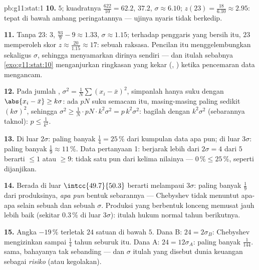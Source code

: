 \begin{solution}{pb:g11:stat:1}
\textbf{10.}  $5$;  kuadratnya $\frac{622}{10} = 62.2$,
 $37.2$, $\sigma \approx 6.10$;
$z(23) = \frac{18}{6.10} \approx 2.95$: tepat di bawah ambang
peringatannya --- ujinya nyaris tidak berkedip.

\textbf{11.} Tanpa $23$:  $3$, 
$\frac{93}{9} - 9 \approx 1.33$, $\sigma \approx 1.15$;
terhadap penggaris yang bersih itu, $23$ memperoleh skor
$z \approx \frac{20}{1.15} \approx 17$: sebuah raksasa. Pencilan itu
menggelembungkan  sekaligus $\sigma$, sehingga menyamarkan dirinya
sendiri --- dan itulah sebabnya \cref{exo:g11:stat:10} menganjurkan ringkasan
yang kekar (, ) ketika pencemaran data mengancam.

\textbf{12.} Pada jumlah ,
$\sigma^2 = \frac1N \sum (x_i - \bar x)^2$, simpanlah hanya
suku dengan $\abs{x_i - \bar x} \geq k\sigma$: ada $pN$
suku semacam itu, masing-masing paling sedikit $(k\sigma)^2$, sehingga
$\sigma^2 \geq \frac{1}{N} \cdot pN \cdot k^2\sigma^2 =
p\,k^2\sigma^2$: bagilah dengan $k^2 \sigma^2$ (sebarannya taknol):
$p \leq \frac{1}{k^2}$.

\textbf{13.} Di luar $2\sigma$: paling banyak $\frac14 = 25\,\%$ dari
kumpulan data apa pun; di luar $3\sigma$: paling banyak
$\frac19 \approx 11\,\%$. Data pertanyaan 1: berjarak lebih dari
$2\sigma = 4$ dari  $5$ berarti $\leq 1$ atau $\geq 9$:
tidak satu pun dari kelima nilainya --- $0\,\% \leq 25\,\%$, seperti dijanjikan.

\textbf{14.} Berada di luar $\intcc{49.7}{50.3}$ berarti melampaui
$3\sigma$: paling banyak $\frac19$ dari produksinya, \emph{apa pun}
bentuk sebarannya --- Chebyshev tidak menuntut apa-apa selain sebuah
 dan sebuah $\sigma$. Produksi yang berbentuk lonceng memusat jauh
lebih baik (sekitar $0.3\,\%$ di luar $3\sigma$): itulah hukum normal
tahun berikutnya.

\textbf{15.} Angka $-19\,\%$ terletak $24$ satuan di bawah  $5$.
Dana B: $24 = 2\sigma_B$: Chebyshev mengizinkan sampai
$\frac14$ tahun seburuk itu. Dana A: $24 = 12\sigma_A$: paling
banyak $\frac{1}{144}$.  sama, bahayanya tak sebanding ---
dan $\sigma$ itulah yang disebut dunia keuangan sebagai \emph{risiko}
(atau kegolakan).


\end{solution}
